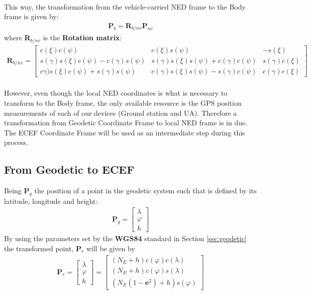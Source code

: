 \paragraph{} This way, the transformation from the vehicle-carried NED frame to the Body frame is given by:
\begin{align}
\textbf{P}_{b} = \textbf{R}_{b/nv}\textbf{P}_{nv}
\end{align}
where \textbf{R}$_{b/nv}$ is the \textbf{Rotation matrix}:
\begin{align*}
\textbf{R}_{b/nv} =
\begin{bmatrix}
c(\xi)c(\psi) & c(\xi)s(\psi) & -s(\xi)\\
s(\gamma)s(\xi)c(\psi) - c(\gamma)s(\psi) & s(\gamma)s(\xi)s(\psi) + c(\gamma)c(\psi) & s(\gamma)c(\xi)\\
c\gamma)s(\xi)c(\psi) + s(\gamma)s(\psi) & c(\gamma)s(\xi)s(\psi) - s(\gamma)c(\psi) & c(\gamma)c(\xi)
\end{bmatrix}
\end{align*}

\paragraph{} However, even though the local NED coordinates is what is necessary to transform to the Body frame, the only available resource  is the GPS position measurements of each of our devices (Ground station and UA). Therefore a transformation from Geodetic Coordinate Frame to local NED frame is in due. The ECEF Coordinate Frame will be used as an intermediate step during this process.

\subsection*{From Geodetic to ECEF}
Being \textbf{P}$_{g}$ the position of a point in the geodetic system such that is defined by its latitude, longitude and height:
\begin{align}
\textbf{P}_{g} = 
\begin{bmatrix}
\lambda \\
\varphi\\
h
\end{bmatrix}
\end{align}
By using the parameters set by the \textbf{WGS84} standard in Section \ref{sec:geodetic} the transformed point, \textbf{P}$_{e}$ will be given by
\begin{align}
\textbf{P}_{e} = 
\begin{bmatrix}
\lambda \\
\varphi\\
h
\end{bmatrix}
=
\begin{bmatrix}
(N_{E}+h)c(\varphi)c(\lambda) \\
(N_{E}+h)c(\varphi)s(\lambda) \\
(N_{E}(1-\textbf{e}^2)+h)s(\varphi)
\end{bmatrix}
\end{align}

